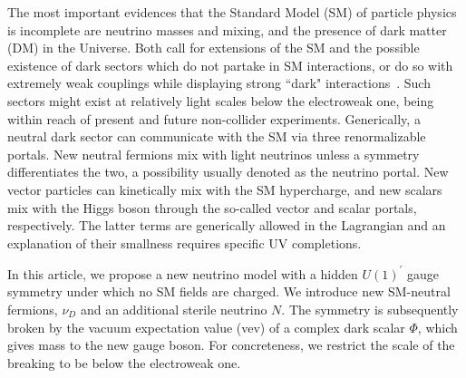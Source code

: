 \graphicspath{{}{dark_nus/}{Diagrams/}}

The most important evidences that the Standard Model (SM) of particle physics is incomplete are neutrino masses and mixing, and the presence of dark matter (DM) in the Universe. Both call for extensions of the SM and the possible existence of dark sectors which do not partake in SM interactions, or do so with extremely weak couplings while displaying strong ``dark" interactions~\cite{Boehm:2003hm,*Boehm:2003ha,Alexander:2016aln}.
Such sectors might exist at relatively light scales below the electroweak one, being within reach of present and future non-collider experiments. Generically, a neutral dark sector can communicate with the SM via three renormalizable portals. New neutral fermions mix with light neutrinos unless a symmetry differentiates the two, a possibility usually denoted as the neutrino portal. New vector particles can kinetically mix with the SM hypercharge, and new scalars mix with the Higgs boson through the so-called vector and scalar portals, respectively. The latter terms are generically allowed in the Lagrangian and an explanation of their smallness requires specific UV completions.  

In this article, we propose a new neutrino model with a hidden $U(1)^\prime$ gauge symmetry under which no SM fields are charged. We introduce new SM-neutral fermions, $\nu_D$ and an additional sterile neutrino $N$. The symmetry is subsequently broken by the vacuum expectation value (vev) of a complex dark scalar $\Phi$, which gives mass to the new gauge boson. For concreteness, we restrict the scale of the breaking to be below the electroweak one. 


